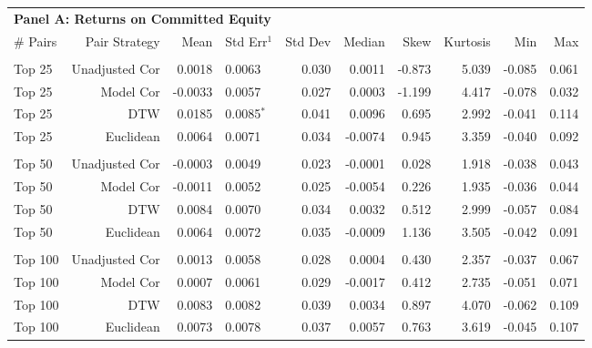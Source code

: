 \documentclass[12pt]{report}
\begin{document}
\begin{table}[hp]
    \fontsize{8pt}{8pt}\selectfont
    \centering
    \begin{tabular}{l r r l r r r r r r}
        \multicolumn{9}{l}{\textbf{Panel A: Returns on Committed Equity}} \\
        \# Pairs & Pair Strategy & Mean & Std Err{$^{1}$} & Std Dev & Median & Skew & Kurtosis & Min & Max \\
        \hline
        \vspace{-1mm} \\
        Top 25    & Unadjusted Cor &  0.0018 & 0.0063          & 0.030 &  0.0011 & -0.873 & 5.039 & -0.085 & 0.061 \\
        Top 25    & Model Cor      & -0.0033 & 0.0057          & 0.027 &  0.0003 & -1.199 & 4.417 & -0.078 & 0.032 \\
        Top 25    & DTW            &  0.0185 & 0.0085{$^{*}$}  & 0.041 &  0.0096 &  0.695 & 2.992 & -0.041 & 0.114 \\
        Top 25    & Euclidean      &  0.0064 & 0.0071          & 0.034 & -0.0074 &  0.945 & 3.359 & -0.040 & 0.092 \\
        \vspace{-1mm} \\
        Top 50    & Unadjusted Cor & -0.0003 & 0.0049          & 0.023 & -0.0001 &  0.028 & 1.918 & -0.038 & 0.043 \\
        Top 50    & Model Cor      & -0.0011 & 0.0052          & 0.025 & -0.0054 &  0.226 & 1.935 & -0.036 & 0.044 \\
        Top 50    & DTW            &  0.0084 & 0.0070          & 0.034 &  0.0032 &  0.512 & 2.999 & -0.057 & 0.084 \\
        Top 50    & Euclidean      &  0.0064 & 0.0072          & 0.035 & -0.0009 &  1.136 & 3.505 & -0.042 & 0.091 \\
        \vspace{-1mm} \\
        Top 100   & Unadjusted Cor &  0.0013 & 0.0058          & 0.028 &  0.0004 &  0.430 & 2.357 & -0.037 & 0.067 \\
        Top 100   & Model Cor      &  0.0007 & 0.0061          & 0.029 & -0.0017 &  0.412 & 2.735 & -0.051 & 0.071 \\
        Top 100   & DTW            &  0.0083 & 0.0082          & 0.039 &  0.0034 &  0.897 & 4.070 & -0.062 & 0.109 \\
        Top 100   & Euclidean      &  0.0073 & 0.0078          & 0.037 &  0.0057 &  0.763 & 3.619 & -0.045 & 0.107 \\

\end{tabular}
\end{table}
\end{document}
